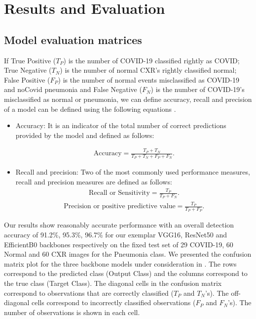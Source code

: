 \section{Results and Evaluation}
\label{sec:results}
\subsection{Model evaluation matrices}

If True Positive ($T_P$) is the number of COVID-19 classified
rightly as COVID; True Negative ($T_N$) is the number of normal
CXR's rightly classified normal; False Positive ($F_P$) is the
number of normal events misclassified as COVID-19 and noCovid pneumonia and False
Negative ($F_N$) is the number of COVID-19's misclassified as
normal or pneumonia, we can define accuracy, recall and precision of a model can be defined using the following equations \cite{SOKOLOVA2009}.

\begin{itemize}
\item {Accuracy: It is an indicator of the total number of correct predictions provided by the model and defined as follows:

\begin{align}
\text{Accuracy} =\frac{T_P+T_N}{T_P+T_N+F_P+F_N}.
\end{align}
}
\item {Recall and precision: Two of the most commonly used performance measures, recall and precision measures are defined as follows:
\begin{align}
\text{Recall or Sensitivity} =\frac{T_P}{T_P+F_N}.
\end{align}
\begin{align}
\text{Precision or positive predictive value} =\frac{T_P}{T_P+F_P}.
\end{align}}

 
\end{itemize}
Our results show reasonably accurate performance with an overall detection accuracy of  91.2\%, 95.3\%, 96.7\% for our exemplar VGG16, ResNet50 and EfficientB0 backbones respectively on the fixed test set of 29 COVID-19, 60 Normal and 60 CXR images for the Pneumonia class. We presented the confusion matrix plot for the three backbone models under consideration in . The rows correspond to the predicted class (Output Class) and the columns correspond to the true class (Target Class). The diagonal cells in the confusion matrix correspond to observations that are correctly classified ($T_P$ and $T_N$'s). The off-diagonal cells correspond to incorrectly classified observations ($F_P$ and $F_N$'s). The number of observations is shown in each cell.


